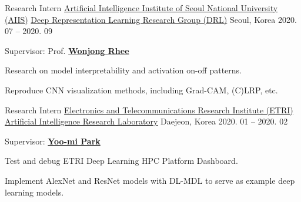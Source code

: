 \documentclass[11pt, a4paper]{cv}
\begin{document}
\begin{cventries}

  \cvexperience
    {Research Intern} %
    {\href{https://aiis.snu.ac.kr/eng/}{Artificial Intelligence Institute of Seoul National University (AIIS)}} %
    {\href{http://drl.snu.ac.kr}{Deep Representation Learning Research Group (DRL)}} %
    {Seoul, Korea} %
    {2020. 07 -- 2020. 09} %
    {
      \begin{cvitems} %
        \item {Supervisor: Prof. \href{http://drl.snu.ac.kr/?p=13209}{\bfseries\color{graytext} Wonjong Rhee}}
        \item {Research on model interpretability and activation on-off patterns.}
        \item {Reproduce CNN visualization methods, including Grad-CAM, (C)LRP, etc.}
      \end{cvitems}
    }


  \cvexperience
    {Research Intern} %
    {\href{https://etri.re.kr/eng/main/main.etri}{Electronics and Telecommunications Research Institute (ETRI)}} %
    {\href{https://etri.re.kr/eng/sub6/sub6_0101.etri?departCode=10}{Artificial Intelligence Research Laboratory}} %
    {Daejeon, Korea} %
    {2020. 01 -- 2020. 02} %
    {
      \begin{cvitems} %
        \item {Supervisor: \href{https://kr.linkedin.com/in/yoomipark-etri}{\bfseries\color{graytext} Yoo-mi Park}}
        \item {Test and debug ETRI Deep Learning HPC Platform Dashboard.}
        \item {Implement AlexNet and ResNet models with DL-MDL to serve as example deep learning models.}
      \end{cvitems}
    }

\end{cventries}
\end{document}
